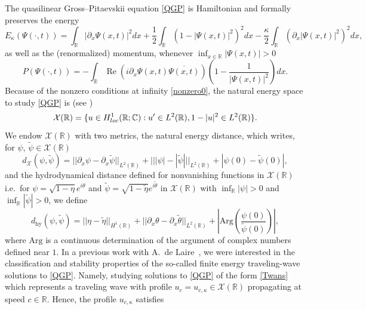 \documentclass[11pt]{article}
\newcommand{\C}{\mathbb{C}}
\newcommand{\R}{\mathbb{R}}
\renewcommand{\Re}{\operatorname{Re}}
\theoremstyle{plain}
\theoremstyle{definition}
\theoremstyle{remark}
\numberwithin{equation}{section}
\begin{document}
{	
	The quasilinear Gross--Pitaevskii equation \eqref{QGP} is Hamiltonian and formally preserves the energy
	\begin{equation}\label{eq:energie}
		E_\kappa(\Psi(\cdot,t))= \int_\R |\partial_x\Psi(x,t)|^2 dx +\frac{1}{2}\int_\R
		\left(1-|\Psi(x,t)|^2\right)^2dx-\frac{\kappa}{2}\int_\R\left (\partial_x |\Psi(x,t)| ^2 \right )^2  dx,
	\end{equation}
	as well as the (renormalized) momentum, whenever $\inf_{x\in\R}|\Psi(x,t)|>0$
	\begin{equation}\label{def:moment}
		P(\Psi(\cdot,t))=-\int_\R\Re( i\partial_x\Psi(x,t)\overline{\Psi(x,t)})\left(1-\frac{1}{|\Psi(x,t)|^2}\right)dx.
	\end{equation}
	Because of the nonzero conditions at infinity \eqref{nonzero0}, the natural energy space to study \eqref{QGP} is (see \cite{delaire2023exotic})  
	\begin{equation}\label{def:boX}
		\mathcal{X}(\R)=\{u\in  H^1_{\rm loc}(\R;\C):u'\in  L^2(\R),1-|u|^2\in L^2(\R)\}.
	\end{equation} 
	We endow $\mathcal{X}(\R)$ with two metrics, the natural energy distance, which writes, for $\psi$, $\tilde{\psi}\in\mathcal{X}(\R)$
	\begin{equation}\label{def:metric}
		d_{\mathcal{X}}(\psi,\tilde{\psi})=||\partial_x\psi-\partial_x\tilde{\psi}||_{ L^2(\R)}+|||\psi|-|\tilde{\psi}|||_{ L^2(\R)}+|\psi(0)-\tilde{\psi}(0)|,
	\end{equation} 
	and the hydrodynamical distance defined for nonvanishing functions in $\mathcal{X}(\R)$ i.e.\ for $\psi=\sqrt{1-\eta}e^{i\theta}$ and $\tilde{\psi}=\sqrt{1-\tilde\eta}e^{i\tilde\theta}$ in $\mathcal{X}(\R)$ with $\inf_\R|\psi|>0$ and $\inf_\R|\tilde{\psi}|>0$, we define
	\begin{equation}\label{def:metric2}
		d_{\mathrm{hy}}(\psi,\tilde{\psi})=||\eta-\tilde{\eta}||_{ H^1(\R)}+||\partial_x\theta-\partial_x\tilde\theta||_{ L^2(\R)}+\left |\mathrm{Arg}\left(\frac{\psi(0)}{\tilde{\psi}(0)}\right)\right|,
	\end{equation}
	where $\mathrm{Arg}$ is a continuous determination of the argument of complex numbers defined near $1$.
	In a previous work with A.~de Laire~\cite{delaire2023exotic}, we were interested in the classification and stability properties of the so-called finite energy traveling-wave solutions to \eqref{QGP}. Namely, studying solutions to \eqref{QGP} of the form \eqref{Twans}
	which represents a traveling wave with profile $u_{c}=u_{c,\kappa}\in\mathcal{X}(\R)$ propagating at speed $c\in\R$. Hence, the profile $u_{c,\kappa}$ satisfies
}
\end{document}
